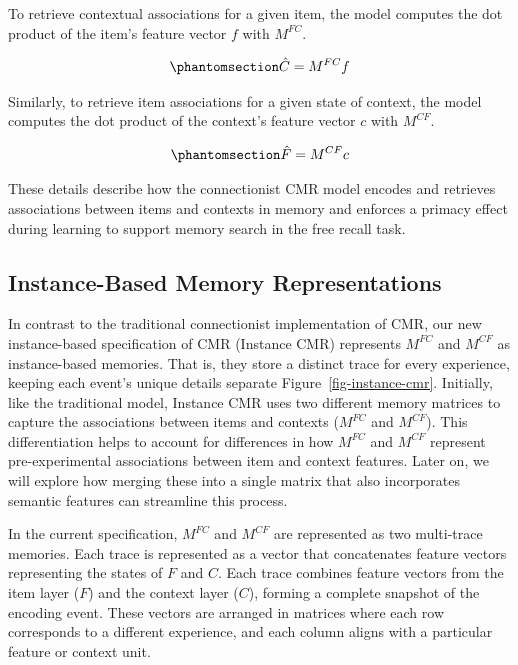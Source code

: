 \documentclass[
  letterpaper,
  11pt,
  english,
  singlespacing,
  headsepline]{MastersDoctoralThesis}
\begin{document}
To retrieve contextual associations for a given item, the model computes
the dot product of the item's feature vector \(f\) with \(M^{FC}\).

\begin{equation}\phantomsection\label{eq-6}{
\hat{C} = M^{FC} f
}\end{equation}

Similarly, to retrieve item associations for a given state of context,
the model computes the dot product of the context's feature vector \(c\)
with \(M^{CF}\).

\begin{equation}\phantomsection\label{eq-7}{
\hat{F} = M^{CF} c
}\end{equation}

These details describe how the connectionist CMR model encodes and
retrieves associations between items and contexts in memory and enforces
a primacy effect during learning to support memory search in the free
recall task.

\subsection{Instance-Based Memory
Representations}\label{instance-based-memory-representations}

In contrast to the traditional connectionist implementation of CMR, our
new instance-based specification of CMR (Instance CMR) represents
\(M^{FC}\) and \(M^{CF}\) as instance-based memories. That is, they
store a distinct trace for every experience, keeping each event's unique
details separate Figure~\ref{fig-instance-cmr}. Initially, like the
traditional model, Instance CMR uses two different memory matrices to
capture the associations between items and contexts (\(M^{FC}\) and
\(M^{CF}\)). This differentiation helps to account for differences in
how \(M^{FC}\) and \(M^{CF}\) represent pre-experimental associations
between item and context features. Later on, we will explore how merging
these into a single matrix that also incorporates semantic features can
streamline this process.

In the current specification, \(M^{FC}\) and \(M^{CF}\) are represented
as two multi-trace memories. Each trace is represented as a vector that
concatenates feature vectors representing the states of \(F\) and \(C\).
Each trace combines feature vectors from the item layer (\(F\)) and the
context layer (\(C\)), forming a complete snapshot of the encoding
event. These vectors are arranged in matrices where each row corresponds
to a different experience, and each column aligns with a particular
feature or context unit.
\end{document}
